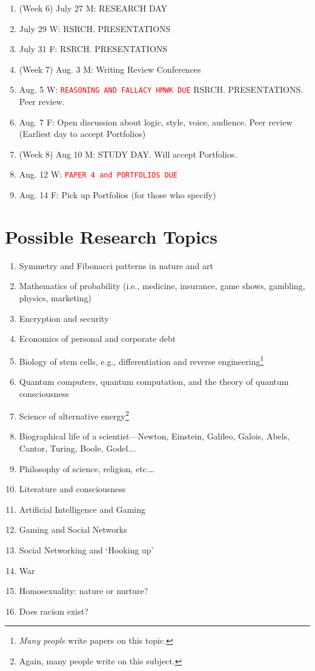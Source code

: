 \documentclass [11pt]{article}
\begin{document}
\begin{enumerate}
\item (Week 6) July 27 M: RESEARCH DAY 
\item[] July 29 W: RSRCH. PRESENTATIONS
\item[] July 31 F: RSRCH. PRESENTATIONS

\item (Week 7) Aug. 3 M: Writing Review Conferences 
\item[] Aug. 5 W: \textcolor{red}{\texttt{REASONING AND FALLACY HMWK DUE}} RSRCH. PRESENTATIONS. Peer review. 
\item[] Aug. 7 F: Open discussion about logic, style, voice, audience. Peer review (Earliest day to accept Portfolios)

\item (Week 8) Aug 10 M: STUDY DAY. Will accept Portfolios.
\item[] Aug. 12 W: \textcolor{red}{\texttt{PAPER 4 and PORTFOLIOS DUE}}
\item[] Aug. 14 F: Pick up Portfolios (for those who specify)
\end{enumerate}


\section{Possible Research Topics}
\begin{enumerate}
\item Symmetry and Fibonacci patterns in nature and art
\item Mathematics of probability (i.e., medicine, insurance, game shows, gambling, physics, marketing)
\item Encryption and security
\item Economics of personal and corporate debt
\item Biology of stem cells, e.g., differentiation and reverse engineering\footnote{\emph{Many people} write papers on this topic.}
\item Quantum computers, quantum computation, and the theory of quantum consciousness
\item Science of alternative energy\footnote{Again, many people write on this subject.}
\item Biographical life of a scientist---Newton, Einstein, Galileo, Galois, Abels, Cantor, Turing, Boole, Godel\ldots{}.
\item Philosophy of science, religion, etc.\ldots
\item Literature and consciousness
\item Artificial Intelligence and Gaming
\item Gaming and Social Networks
\item Social Networking and `Hooking up'
\item War
\item Homosexuality: nature or nurture?
\item Does racism exist?\end{enumerate}
\end{document}
